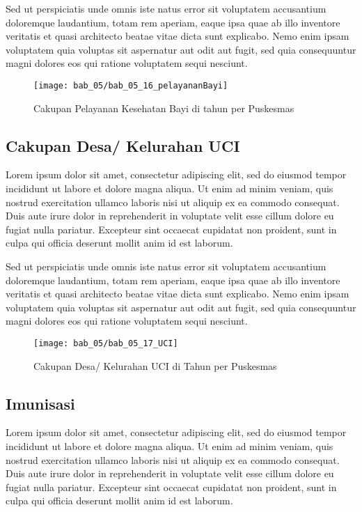 Sed ut perspiciatis unde omnis iste natus error sit voluptatem accusantium doloremque laudantium, totam rem aperiam, eaque ipsa quae ab illo inventore veritatis et quasi architecto beatae vitae dicta sunt explicabo. Nemo enim ipsam voluptatem quia voluptas sit aspernatur aut odit aut fugit, sed quia consequuntur magni dolores eos qui ratione voluptatem sequi nesciunt.

\begin{figure}[H]
    \centering
    \texttt{[image: bab\_05/bab\_05\_16\_pelayananBayi]}
    \caption{Cakupan Pelayanan Kesehatan Bayi di \namaKabupaten tahun \tP per Puskesmas}
    \label{fig:Cakupan-Pelayanan-Kesehatan-Bayi}
\end{figure}

\subsection{Cakupan Desa/ Kelurahan UCI}
Lorem ipsum dolor sit amet, consectetur adipiscing elit, sed do eiusmod tempor incididunt ut labore et dolore magna aliqua. Ut enim ad minim veniam, quis nostrud exercitation ullamco laboris nisi ut aliquip ex ea commodo consequat. Duis aute irure dolor in reprehenderit in voluptate velit esse cillum dolore eu fugiat nulla pariatur. Excepteur sint occaecat cupidatat non proident, sunt in culpa qui officia deserunt mollit anim id est laborum.

Sed ut perspiciatis unde omnis iste natus error sit voluptatem accusantium doloremque laudantium, totam rem aperiam, eaque ipsa quae ab illo inventore veritatis et quasi architecto beatae vitae dicta sunt explicabo. Nemo enim ipsam voluptatem quia voluptas sit aspernatur aut odit aut fugit, sed quia consequuntur magni dolores eos qui ratione voluptatem sequi nesciunt.

\begin{figure}[H]
    \centering
    \texttt{[image: bab\_05/bab\_05\_17\_UCI]}
    \caption{Cakupan Desa/ Kelurahan UCI di \namaKabupaten Tahun \tP per Puskesmas}
    \label{fig:Cakupan-Desa-UCI}
\end{figure}

\subsection{Imunisasi}
Lorem ipsum dolor sit amet, consectetur adipiscing elit, sed do eiusmod tempor incididunt ut labore et dolore magna aliqua. Ut enim ad minim veniam, quis nostrud exercitation ullamco laboris nisi ut aliquip ex ea commodo consequat. Duis aute irure dolor in reprehenderit in voluptate velit esse cillum dolore eu fugiat nulla pariatur. Excepteur sint occaecat cupidatat non proident, sunt in culpa qui officia deserunt mollit anim id est laborum.

